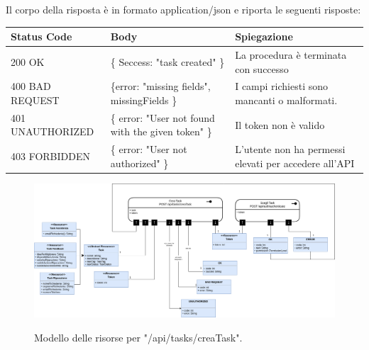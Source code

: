 \documentclass{report}
\begin{document}
Il corpo della risposta è in formato application/json e riporta le seguenti risposte:

\begin{center} %
	\centering
	\begin{tabular}{ |p{4cm}|p{4cm}|p{4cm}| }
		\hline
		\centering Status Code & \qquad\qquad\quad Body & \qquad\quad Spiegazione\\ %
		\hline
		200 OK & \{ Seccess: "task created" \}  & La procedura è terminata con successo	\\ 
		\hline
		400 BAD REQUEST & \{error: "missing fields", missingFields \} & I campi richiesti sono mancanti o malformati. \\
		\hline
		401 UNAUTHORIZED & \{ error: "User not found with the given token" \} & Il token non è valido \\
		\hline
		403 FORBIDDEN & \{ error: "User not authorized" \} &  L'utente non ha permessi elevati per accedere all'API \\
		\hline
	\end{tabular}
\end{center}
\begin{figure}[H]
	\centering\includegraphics[width=1\textwidth]{images/model_crea_task.png}
	
	Modello delle risorse per "/api/tasks/creaTask".
\end{figure}
\end{document}
